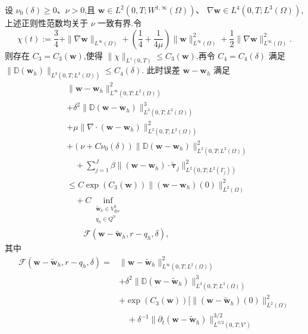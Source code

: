 \begin{theorem}
\label{thm:smagorinsky-error-estimate-uniform}\label{thm:smagorinsky-error-estimate}
设 $\nu_0(\delta)\ge0$、$\nu>0$,且
$\bm{w}\in L^2(0,T;W^{1,\infty}(\Omega))$、
$\nabla\bm{w}\in L^4(0,T;L^3(\Omega))$,上述正则性范数均关于 $\nu$ 一致有界.令
\[
\chi(t):=\frac34+\|\nabla\bm{w}\|_{L^\infty(\Omega)}
 +\left(\frac14+\frac1{4\mu}\right)
       \|\bm{w}\|_{L^\infty(\Omega)}^2
 +\frac12\|\nabla\bm{w}\|_{L^\infty(\Omega)}^2.
\]
则存在 $C_3=C_3(\bm{w})$,使得
$\|\chi\|_{L^1(0,T)}\le C_3(\bm{w})$.再令
$C_4=C_4(\delta)$ 满足
$\|\mathbb{D}(\bm{w}_h)\|_{L^3(0,T;L^3(\Omega))}\le C_4(\delta)$.
此时误差 $\bm{w}-\bm{w}_h$ 满足
\begin{equation}\label{eq:smagorinsky-error-estimate-uniform}
\begin{aligned}
 &\|\bm{w}-\bm{w}_h\|_{L^\infty(0,T;L^2(\Omega))}^2\\
 &+\delta^2\|\mathbb{D}(\bm{w}-\bm{w}_h)\|_{L^3(0,T;L^3(\Omega))}^3\\
 &+\mu\|\nabla\cdot(\bm{w}-\bm{w}_h)\|_{L^2(0,T;L^2(\Omega))}^2\\
 &+(\nu+C\nu_0(\delta))
   \|\mathbb{D}(\bm{w}-\bm{w}_h)\|_{L^2(0,T;L^2(\Omega))}^2\\
&\quad+\sum_{j=1}^J\beta
 \|(\bm{w}-\bm{w}_h)\cdot\widetilde{\symbf{\tau}}_j
   \|_{L^2(0,T;L^2(\Gamma_j))}^2\\
&\le C\exp(C_3(\bm{w}))
 \| (\bm{w}-\bm{w}_h)(0)\|_{L^2(\Omega)}^2\\
&\quad+C\inf_{\substack{\widetilde{\bm{w}}_h\in V_{\mathrm{div}}^h\\
                         q_h\in Q^h}}\\
&\qquad\mathcal{F}(\bm{w}-\widetilde{\bm{w}}_h,r-q_h,\delta),
\end{aligned}
\end{equation}
其中
\begin{equation}\label{eq:smagorinsky-error-functional-uniform}
\begin{aligned}
\mathcal{F}(\bm{w}-\widetilde{\bm{w}}_h,r-q_h,\delta)
={}&\|\bm{w}-\widetilde{\bm{w}}_h\|_{L^\infty(0,T;L^2(\Omega))}^2\\
&+\delta^2\|\mathbb{D}(\bm{w}-\widetilde{\bm{w}}_h)\|_{L^3(0,T;L^3(\Omega))}^3\\
&+\exp(C_3(\bm{w}))\Biggl[
 \|(\bm{w}-\widetilde{\bm{w}}_h)(0)\|_{L^2(\Omega)}^2\\
&\quad+\delta^{-1}
 \|\partial_t(\bm{w}-\widetilde{\bm{w}}_h)\|_{L^{3/2}(0,T;V')}^{3/2}\\

\end{aligned}
\end{equation}
\end{theorem}
